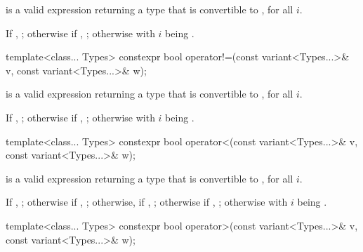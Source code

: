 \begin{itemdescr}
\pnum
\requires
{} is a valid expression returning a type that is
convertible to , for all $i$.

\pnum
\returns
If , ;
otherwise if , ;
otherwise  with $i$ being .
\end{itemdescr}

%
\begin{itemdecl}
template<class... Types>
  constexpr bool operator!=(const variant<Types...>& v, const variant<Types...>& w);
\end{itemdecl}

\begin{itemdescr}
\pnum
\requires
{} is a valid expression returning a type that is
convertible to , for all $i$.

\pnum
\returns
If , ;
otherwise if , ;
otherwise  with $i$ being .
\end{itemdescr}

%
\begin{itemdecl}
template<class... Types>
  constexpr bool operator<(const variant<Types...>& v, const variant<Types...>& w);
\end{itemdecl}

\begin{itemdescr}
\pnum
\requires
{} is a valid expression returning a type that is
convertible to , for all $i$.

\pnum
\returns
If , ;
otherwise if , ;
otherwise, if , ;
otherwise if , ;
otherwise  with $i$ being .
\end{itemdescr}

%
\begin{itemdecl}
template<class... Types>
  constexpr bool operator>(const variant<Types...>& v, const variant<Types...>& w);
\end{itemdecl}

